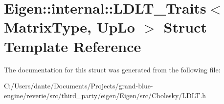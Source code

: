 \hypertarget{struct_eigen_1_1internal_1_1_l_d_l_t___traits}{}\section{Eigen\+::internal\+::L\+D\+L\+T\+\_\+\+Traits$<$ Matrix\+Type, Up\+Lo $>$ Struct Template Reference}
\label{struct_eigen_1_1internal_1_1_l_d_l_t___traits}


The documentation for this struct was generated from the following file\+:\begin{DoxyCompactItemize}
\item 
C\+:/\+Users/dante/\+Documents/\+Projects/grand-\/blue-\/engine/reverie/src/third\+\_\+party/eigen/\+Eigen/src/\+Cholesky/L\+D\+L\+T.\+h\end{DoxyCompactItemize}
